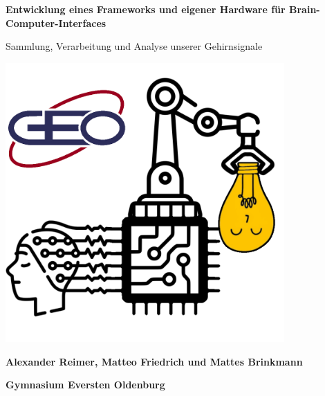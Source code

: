 \documentclass[10pt]{article}
\begin{document}

\thispagestyle{empty}

\vspace*{10mm}
{
	\begin{center}
		{\Huge \textbf{\sansemph Entwicklung eines Frameworks und eigener Hardware für Brain-Computer-Interfaces}}
		
		\vspace*{2mm}
		{\Large Sammlung, Verarbeitung und Analyse unserer Gehirnsignale}
		\vspace*{4mm}
	\end{center}

	\begin{center}
		\includegraphics[width=0.8\textwidth]{logo.png}
		\vspace*{10mm}
		
		{\huge \textbf{Alexander Reimer, Matteo Friedrich und Mattes Brinkmann}}
		
		\vspace*{1em}
		{\LARGE \textbf{Gymnasium Eversten Oldenburg}}
		\vspace*{2em}
	\end{center}
}

\newpage
{}
\end{document}

